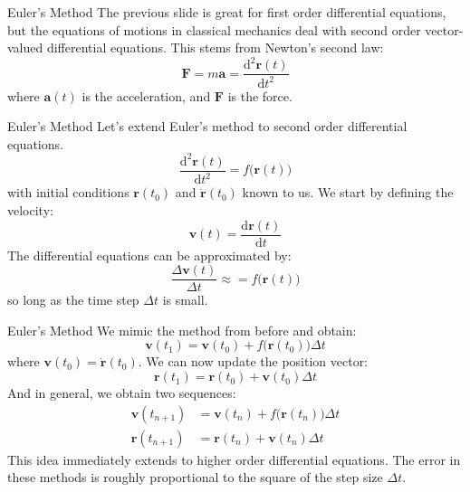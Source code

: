 \documentclass{beamer}
\begin{document}
    \begin{frame}{Euler's Method}
        The previous slide is great for first order differential equations,
        but the equations of motions in classical mechanics deal with
        second order vector-valued differential equations. This stems from
        Newton's second law:
        \begin{equation}
            \mathbf{F}=m\mathbf{a}
                =\frac{\textrm{d}^{2}\mathbf{r}(t)}{\textrm{d}t^{2}}
        \end{equation}
        where $\mathbf{a}(t)$ is the acceleration, and $\mathbf{F}$ is the
        force.
    \end{frame}
    \begin{frame}{Euler's Method}
        Let's extend Euler's method to second order differential equations.
        \begin{equation}
            \frac{\textrm{d}^{2}\mathbf{r}(t)}{\textrm{d}t^{2}}
                =f\big(\mathbf{r}(t)\big)
        \end{equation}
        with initial conditions $\mathbf{r}(t_{0})$ and
        $\dot{\mathbf{r}}(t_{0})$ known to us.
        We start by defining the velocity:
        \begin{equation}
            \mathbf{v}(t)=\frac{\textrm{d}\mathbf{r}(t)}{\textrm{d}t}
        \end{equation}
        The differential equations can be approximated by:
        \begin{equation}
            \frac{\Delta\mathbf{v}(t)}{\Delta{t}}
            \approx=f\big(\mathbf{r}(t)\big)
        \end{equation}
        so long as the time step $\Delta{t}$ is small.
    \end{frame}
    \begin{frame}{Euler's Method}
        We mimic the method from before and obtain:
        \begin{equation}
            \mathbf{v}(t_{1})=\mathbf{v}(t_{0})
                +f\big(\mathbf{r}(t_{0})\big)\Delta{t}
        \end{equation}
        where $\mathbf{v}(t_{0})=\dot{\mathbf{r}}(t_{0})$. We can now update
        the position vector:
        \begin{equation}
            \mathbf{r}(t_{1})
                =\mathbf{r}(t_{0})+\mathbf{v}(t_{0})\Delta{t}
        \end{equation}
        And in general, we obtain two sequences:
        \begin{align}
            \mathbf{v}(t_{n+1})&=\mathbf{v}(t_{n})
                +f\big(\mathbf{r}(t_{n})\big)\Delta{t}\\
            \mathbf{r}(t_{n+1})
                &=\mathbf{r}(t_{n})+\mathbf{v}(t_{n})\Delta{t}
        \end{align}
        This idea immediately extends to higher order differential equations.
        The error in these methods is roughly proportional to the square
        of the step size $\Delta{t}$.
    \end{frame}
\end{document}

